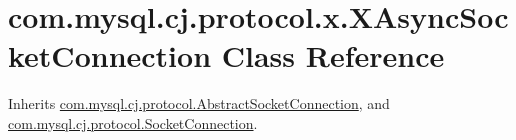 \hypertarget{classcom_1_1mysql_1_1cj_1_1protocol_1_1x_1_1_x_async_socket_connection}{}\section{com.\+mysql.\+cj.\+protocol.\+x.\+X\+Async\+Socket\+Connection Class Reference}
\label{classcom_1_1mysql_1_1cj_1_1protocol_1_1x_1_1_x_async_socket_connection}


Inherits \mbox{\hyperlink{classcom_1_1mysql_1_1cj_1_1protocol_1_1_abstract_socket_connection}{com.\+mysql.\+cj.\+protocol.\+Abstract\+Socket\+Connection}}, and \mbox{\hyperlink{interfacecom_1_1mysql_1_1cj_1_1protocol_1_1_socket_connection}{com.\+mysql.\+cj.\+protocol.\+Socket\+Connection}}.

